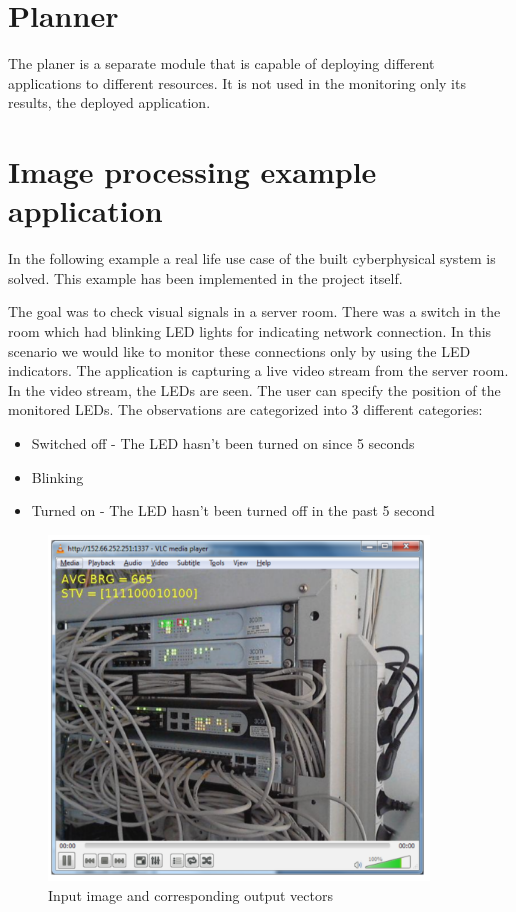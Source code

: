 \section{Planner}
The planer is a separate module that is capable of deploying different applications to different resources. It is not used in the monitoring only its results, the deployed application.

\section{Image processing example application}

In the following example a real life use case of the built cyberphysical system is solved. This example has been implemented in the project itself\cite{g6d1}. 

The goal was to check visual signals in a server room. There was a switch in the room which had blinking LED lights for indicating network connection. In this scenario we would like to monitor these connections only by using the LED indicators. The application is capturing a live video stream from the server room. In the video stream, the LEDs are seen. The user can specify the position of the monitored LEDs. The observations are categorized into 3 different categories:
\begin{itemize}
	\item Switched off - The LED hasn't been turned on since 5 seconds
	\item Blinking
	\item Turned on - The LED hasn't been turned off in the past 5 second
\end{itemize}

\begin{figure}[h]
	\centering
	\includegraphics[width=0.9\textwidth]{figures/switchwork.png}
	\caption{Input image and corresponding output vectors\label{fig:switchwork}}
\end{figure}

